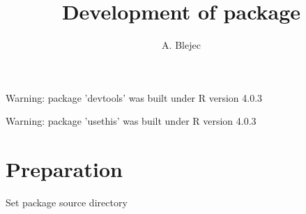\documentclass[a4paper,12pt]{article}\usepackage[]{graphicx}\usepackage[]{color}
\begin{document}
\title{Development of package }
\author{A. Blejec}
%

\maketitle
\tableofcontents

\begin{Schunk}
\begin{Soutput}
Warning: package 'devtools' was built under R version 4.0.3
\end{Soutput}
\begin{Soutput}
Warning: package 'usethis' was built under R version 4.0.3
\end{Soutput}
\end{Schunk}

\clearpage
\section{Preparation}


Set package source directory
\end{document}
